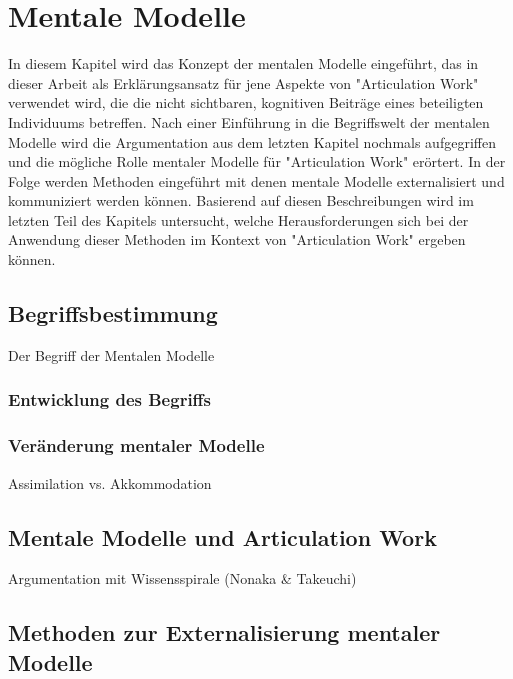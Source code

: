\chapter{Mentale Modelle}
\label{cha:mentale_modelle}

In diesem Kapitel wird das Konzept der mentalen Modelle eingeführt, das in dieser Arbeit als Erklärungsansatz für jene Aspekte von "Articulation Work" verwendet wird, die die nicht sichtbaren, kognitiven Beiträge eines beteiligten Individuums betreffen. Nach einer Einführung in die Begriffswelt der mentalen Modelle wird die Argumentation aus dem letzten Kapitel nochmals aufgegriffen und die mögliche Rolle mentaler Modelle für "Articulation Work" erörtert. In der Folge werden Methoden eingeführt mit denen mentale Modelle externalisiert und kommuniziert werden können. Basierend auf diesen Beschreibungen wird im letzten Teil des Kapitels untersucht, welche Herausforderungen sich bei der Anwendung dieser Methoden im Kontext von "Articulation Work" ergeben können.

\section{Begriffsbestimmung}
\label{sec:begriffsbestimmung}

Der Begriff der Mentalen Modelle 

\subsection{Entwicklung des Begriffs}
\label{sub:entwicklung_des_begriffs}

\subsection{Veränderung mentaler Modelle}
\label{sub:veränderung_mentaler_modelle}
Assimilation vs. Akkommodation

\section{Mentale Modelle und Articulation Work}
\label{sec:mentale_modelle_und_articulation_work}

Argumentation mit Wissensspirale (Nonaka \& Takeuchi)

\section{Methoden zur Externalisierung mentaler Modelle}
\label{sec:methoden_zur_externalisierung_mentaler_modelle}

